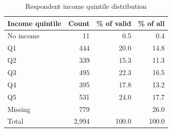 \begin{table}[htbp]
\centering
\caption{Respondent income quintile distribution}
\begin{tabular}{lrrr}
\toprule
Income quintile & Count & \% of valid & \% of all \\
\midrule
No income & 11 & 0.5 & 0.4 \\
Q1 & 444 & 20.0 & 14.8 \\
Q2 & 339 & 15.3 & 11.3 \\
Q3 & 495 & 22.3 & 16.5 \\
Q4 & 395 & 17.8 & 13.2 \\
Q5 & 531 & 24.0 & 17.7 \\
\midrule
Missing & 779 &  & 26.0 \\
\midrule
Total & 2,994 & 100.0 & 100.0 \\
\bottomrule
\end{tabular}
\end{table}
